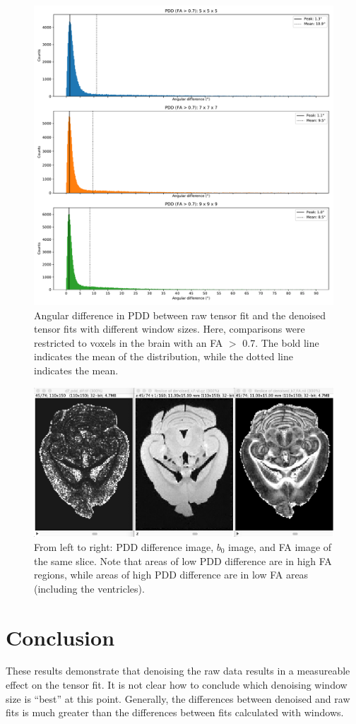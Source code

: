 \documentclass{article}
\begin{document}
\begin{figure}[h]
  \centering
  \captionsetup{width=0.6\linewidth}
  \includegraphics[width=0.6\linewidth]{../figs/noreg_pdd_famask}
  \caption{Angular difference in PDD between raw tensor fit and the denoised
    tensor fits with different window sizes. Here, comparisons were restricted
    to voxels in the brain with an FA $>$ 0.7. The bold line indicates the mean
    of the distribution, while the dotted line indicates the mean. }
  \label{fig:pdd_famask}
\end{figure}


\begin{figure}[H]
  \centering
  \captionsetup{width=0.6\linewidth}  
  \includegraphics[width=0.6\linewidth]{../figs/pdd_diff}
  \caption{From left to right: PDD difference image, $b_0$ image, and
    FA image of the same slice. Note that areas of low PDD difference are
    in high FA regions, while areas of high PDD difference are in low
  FA areas (including the ventricles).}
  \label{fig:screenshot}
\end{figure}

\section*{Conclusion}
These results demonstrate that denoising the raw data results in a measureable
effect on the tensor fit. It is not clear how to conclude which denoising window
size is ``best'' at this point. Generally, the differences between denoised and
raw fits is much greater than the differences between fits calculated with
windows.
\end{document}
